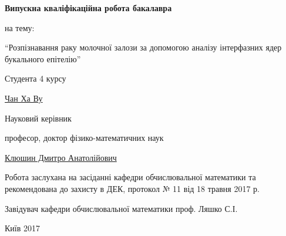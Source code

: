 \documentclass[
11pt, %
oneside, %
english, ukrainian, %
singlespacing, %
parskip, %
headsepline, %
]{MastersDoctoralThesis} %
\author{John \textsc{Smith}} %
\begin{document}
\frontmatter %

\pagestyle{plain} %


\begin{titlepage}
	\centering
	{\scshape\Large\univname\par}
	{\scshape\Large\facname\par} 
	\vspace{3cm}
	
	{\Large\bfseries Випускна кваліфікаційна робота бакалавра\par}
	{\Large на тему:\par}
	{\LARGE \enquote{Розпізнавання раку молочної залози за допомогою аналізу інтерфазних ядер букального епітелію} \par}
	\vspace{3cm}
	
	\flushright
	{\large Студента 4 курсу \par}
	{\large \deptname \par}	
	{\large \href{tranhavu@knu.ua}{Чан Ха Ву}\par}
	\vspace{1cm}
	
	{\large Науковий керівник \par}
	{\large професор, доктор фізико-математичних наук\par}
	{\large \href{dokmed5@gmail.com}{Клюшин Дмитро Анатолійович}\par}
	\vspace{2cm}
	
	\flushleft	
	{\large Робота заслухана на засіданні кафедри обчислювальної математики та рекомендована до захисту в ДЕК, протокол № 11 від 18 травня 2017 р.\par}
	\vspace{1cm}
	{\large Завідувач кафедри обчислювальної математики \hfill проф. Ляшко С.І.\par}
	\vspace{1cm}
	
	\centering
	\vfill
	{\large Київ}
	{\large 2017} 
\end{titlepage}


\newenvironment{megaalgorithm}[1][htb]
{\renewcommand{\algorithmcfname}{Алгоритм}%
	\begin{algorithm}[#1]%
	}{\end{algorithm}}
\end{document}
